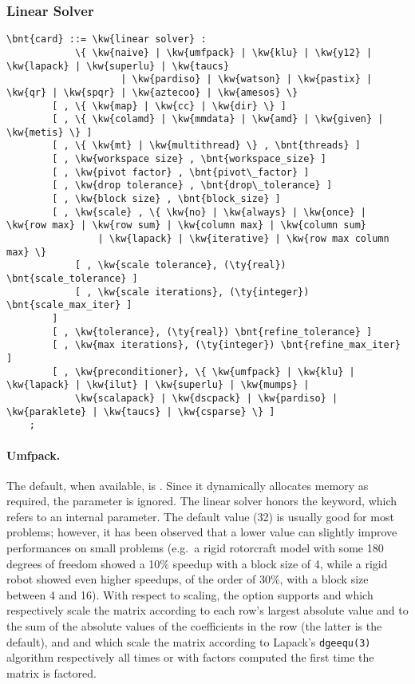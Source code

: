 \subsubsection{Linear Solver}   
\label{sec:LINEAR-SOLVER}
\begin{Verbatim}[commandchars=\\\{\}]
    \bnt{card} ::= \kw{linear solver} :
            \{ \kw{naive} | \kw{umfpack} | \kw{klu} | \kw{y12} | \kw{lapack} | \kw{superlu} | \kw{taucs} 
                    | \kw{pardiso} | \kw{watson} | \kw{pastix} | \kw{qr} | \kw{spqr} | \kw{aztecoo} | \kw{amesos} \}
        [ , \{ \kw{map} | \kw{cc} | \kw{dir} \} ]
        [ , \{ \kw{colamd} | \kw{mmdata} | \kw{amd} | \kw{given} | \kw{metis} \} ]
        [ , \{ \kw{mt} | \kw{multithread} \} , \bnt{threads} ]
        [ , \kw{workspace size} , \bnt{workspace_size} ] 
        [ , \kw{pivot factor} , \bnt{pivot\_factor} ]
        [ , \kw{drop tolerance} , \bnt{drop\_tolerance} ]
        [ , \kw{block size} , \bnt{block_size} ]
        [ , \kw{scale} , \{ \kw{no} | \kw{always} | \kw{once} | \kw{row max} | \kw{row sum} | \kw{column max} | \kw{column sum}
                | \kw{lapack} | \kw{iterative} | \kw{row max column max} \}
            [ , \kw{scale tolerance}, (\ty{real}) \bnt{scale_tolerance} ]
            [ , \kw{scale iterations}, (\ty{integer}) \bnt{scale_max_iter} ]
        ]
        [ , \kw{tolerance}, (\ty{real}) \bnt{refine_tolerance} ]
        [ , \kw{max iterations}, (\ty{integer}) \bnt{refine_max_iter} ]
        [ , \kw{preconditioner}, \{ \kw{umfpack} | \kw{klu} | \kw{lapack} | \kw{ilut} | \kw{superlu} | \kw{mumps} | 
            \kw{scalapack} | \kw{dscpack} | \kw{pardiso} | \kw{paraklete} | \kw{taucs} | \kw{csparse} \} ]
    ;
\end{Verbatim}

\paragraph{Umfpack.}
The default, when available, is .
Since it dynamically allocates memory as required, the  
parameter is ignored.
The  linear solver honors the  keyword,
which refers to an internal parameter.
The default value (32) is usually good for most problems; however,
it has been observed that a lower value can slightly improve
performances on small problems (e.g.\ a rigid rotorcraft model
with some 180 degrees of freedom showed a 10\% speedup with 
a block size of 4, while a rigid robot showed even higher speedups,
of the order of 30\%, with a block size between 4 and 16).
With respect to scaling, the  option supports  and 
which respectively scale the matrix according to each row's
largest absolute value and to the sum of the absolute values
of the coefficients in the row (the latter is the default),
and  and  which scale the matrix
according to Lapack's \texttt{dgeequ(3)} algorithm
respectively all times or with factors computed the first time
the matrix is factored.

